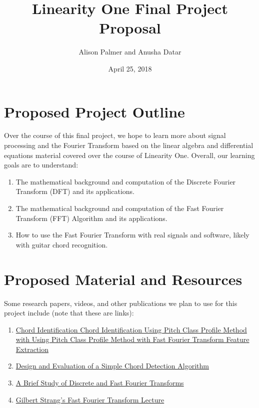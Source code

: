 \documentclass{article}
\title{Linearity One Final Project Proposal}
\author{Alison Palmer and Anusha Datar}
\date{April 25, 2018}
\begin{document}
\maketitle

\section{Proposed Project Outline}
Over the course of this final project, we hope to learn more about signal processing and the Fourier Transform based on the linear algebra and differential equations material covered over the course of Linearity One. Overall, our learning goals are to understand:

\begin{enumerate}
  \item The mathematical background and computation of the Discrete Fourier Transform (DFT) and its applications.
  \item The mathematical background and computation of the Fast Fourier Transform (FFT) Algorithm and its applications.
  \item How to use the Fast Fourier Transform with real signals and software, likely with guitar chord recognition. 
\end{enumerate}

\section{Proposed Material and Resources}

Some research papers, videos, and other publications we plan to use for this project include (note that these are links):

\begin{enumerate}
    \item\href {http://ijcsi.org/papers/IJCSI-11-3-1-139-144.pdf}{Chord Identification Chord Identification Using Pitch Class Profile Method with Using Pitch Class Profile Method with Fast Fourier Transform Feature Extraction}
    \item\href{http://www.fim.uni-passau.de/fileadmin/files/lehrstuhl/sauer/geyer/BA_MA_Arbeiten/BA-HausnerChristoph-201409.pdf}{Design and Evaluation of a Simple Chord
    Detection Algorithm} 
    \item\href{http://www.math.uchicago.edu/~may/VIGRE/VIGRE2010/REUPapers/Anand.pdf}{A Brief Study of Discrete and Fast Fourier Transforms}
    \item\href{https://www.youtube.com/watch?v=M0Sa8fLOajA}{Gilbert Strang's Fast Fourier Transform Lecture}
    

\end{enumerate}
\end{document}
